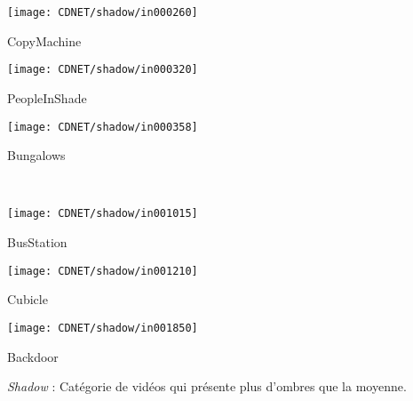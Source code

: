 	\begin{figureth}
		\begin{subfigureth}{0.24\textwidth}
			\texttt{[image: CDNET/shadow/in000260]}\caption{CopyMachine}
		\end{subfigureth}
		\begin{subfigureth}{0.24\textwidth}
			\texttt{[image: CDNET/shadow/in000320]}\caption{PeopleInShade}
		\end{subfigureth}
		\begin{subfigureth}{0.24\textwidth}
			\texttt{[image: CDNET/shadow/in000358]}\caption{Bungalows}	
		\end{subfigureth}\\
		\begin{subfigureth}{0.24\textwidth}
			\texttt{[image: CDNET/shadow/in001015]}\caption{BusStation}	
		\end{subfigureth}
		\begin{subfigureth}{0.24\textwidth}
			\texttt{[image: CDNET/shadow/in001210]}\caption{Cubicle}
		\end{subfigureth}
		\begin{subfigureth}{0.24\textwidth}
			\texttt{[image: CDNET/shadow/in001850]}\caption{Backdoor}	
		\end{subfigureth}
		\caption[Catégorie Shadow]{\textit{Shadow} : Catégorie de vidéos qui présente plus d'ombres que la moyenne.}\label{fig:cdnet:shadow}
	\end{figureth}

